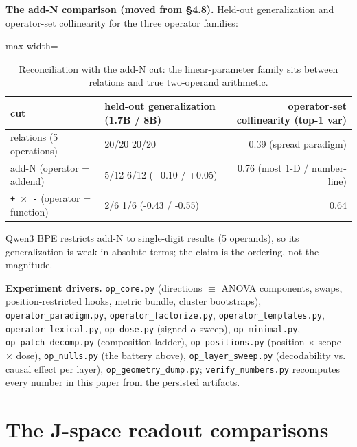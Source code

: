 \textbf{The add-N comparison (moved from \S{}4.8).} Held-out generalization
and operator-set collinearity for the three operator families:

{
\begin{table}[H]
\centering\small
\setlength{\tabcolsep}{4pt}
\begin{adjustbox}{max width=\textwidth}
\begin{tabular}{llr}
\toprule
cut & held-out generalization (1.7B / 8B) & operator-set collinearity
(top-1 var) \\
\midrule
relations (5 operations) & 20/20 \textperiodcentered{} 20/20 & 0.39 (spread paradigm) \\
add-N (operator = addend) & 5/12 \textperiodcentered{} 6/12 (+0.10 / +0.05) & 0.76 (most 1-D
/ number-line) \\
\texttt{+\ \ensuremath{\times}\ -} (operator = function) & 2/6 \textperiodcentered{} 1/6 (-0.43 / -0.55) &
0.64 \\
\bottomrule
\end{tabular}
\end{adjustbox}
\caption{Reconciliation with the add-N cut: the linear-parameter family sits between relations and true two-operand arithmetic.}
\end{table}
}

Qwen3 BPE restricts add-N to single-digit results (5 operands), so its
generalization is weak in absolute terms; the claim is the ordering, not
the magnitude.

\textbf{Experiment drivers.} \texttt{op\_core.py} (directions \ensuremath{\equiv} ANOVA
components, swaps, position-restricted hooks, metric bundle, cluster
bootstraps), \texttt{operator\_paradigm.py},
\texttt{operator\_factorize.py}, \texttt{operator\_templates.py},
\texttt{operator\_lexical.py}, \texttt{op\_dose.py} (signed \ensuremath{\alpha} sweep),
\texttt{op\_minimal.py}, \texttt{op\_patch\_decomp.py} (composition
ladder), \texttt{op\_positions.py} (position \ensuremath{\times} scope \ensuremath{\times} dose),
\texttt{op\_nulls.py} (the battery above), \texttt{op\_layer\_sweep.py}
(decodability vs. causal effect per layer),
\texttt{op\_geometry\_dump.py}; \texttt{verify\_numbers.py} recomputes
every number in this paper from the persisted artifacts.

\section{The J-space readout
comparisons}

